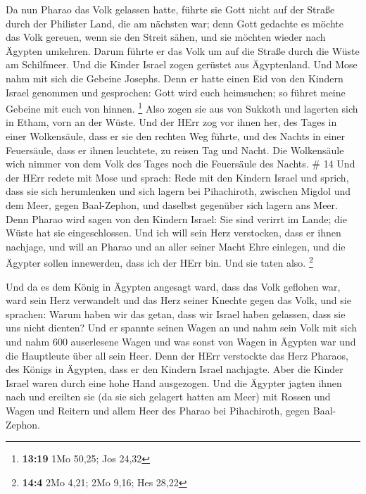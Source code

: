  Da nun Pharao das Volk gelassen hatte, führte sie Gott
nicht auf der Straße durch der Philister Land, die am nächsten war; denn
Gott gedachte es möchte das Volk gereuen, wenn sie den Streit sähen, und
sie möchten wieder nach Ägypten umkehren.  Darum führte er
das Volk um auf die Straße durch die Wüste am Schilfmeer. Und die Kinder
Israel zogen gerüstet aus Ägyptenland.  Und Mose nahm mit
sich die Gebeine Josephs. Denn er hatte einen Eid von den Kindern Israel
genommen und gesprochen: Gott wird euch heimsuchen; so führet meine
Gebeine mit euch von hinnen. \footnote{\textbf{13:19} 1Mo 50,25; Jos
  24,32}  Also zogen sie aus von Sukkoth und lagerten sich
in Etham, vorn an der Wüste.  Und der HErr zog vor ihnen
her, des Tages in einer Wolkensäule, dass er sie den rechten Weg führte,
und des Nachts in einer Feuersäule, dass er ihnen leuchtete, zu reisen
Tag und Nacht.  Die Wolkensäule wich nimmer von dem Volk
des Tages noch die Feuersäule des Nachts. \# 14  Und der
HErr redete mit Mose und sprach:  Rede mit den Kindern
Israel und sprich, dass sie sich herumlenken und sich lagern bei
Pihachiroth, zwischen Migdol und dem Meer, gegen Baal-Zephon, und
daselbst gegenüber sich lagern ans Meer.  Denn Pharao wird
sagen von den Kindern Israel: Sie sind verirrt im Lande; die Wüste hat
sie eingeschlossen.  Und ich will sein Herz verstocken, dass
er ihnen nachjage, und will an Pharao und an aller seiner Macht Ehre
einlegen, und die Ägypter sollen innewerden, dass ich der HErr bin. Und
sie taten also. \footnote{\textbf{14:4} 2Mo 4,21; 2Mo 9,16; Hes 28,22}

 Und da es dem König in Ägypten angesagt ward, dass das Volk
geflohen war, ward sein Herz verwandelt und das Herz seiner Knechte
gegen das Volk, und sie sprachen: Warum haben wir das getan, dass wir
Israel haben gelassen, dass sie uns nicht dienten?  Und er
spannte seinen Wagen an und nahm sein Volk mit sich  und
nahm 600 auserlesene Wagen und was sonst von Wagen in Ägypten war und
die Hauptleute über all sein Heer.  Denn der HErr verstockte
das Herz Pharaos, des Königs in Ägypten, dass er den Kindern Israel
nachjagte. Aber die Kinder Israel waren durch eine hohe Hand ausgezogen.
 Und die Ägypter jagten ihnen nach und ereilten sie (da sie
sich gelagert hatten am Meer) mit Rossen und Wagen und Reitern und allem
Heer des Pharao bei Pihachiroth, gegen Baal-Zephon.


